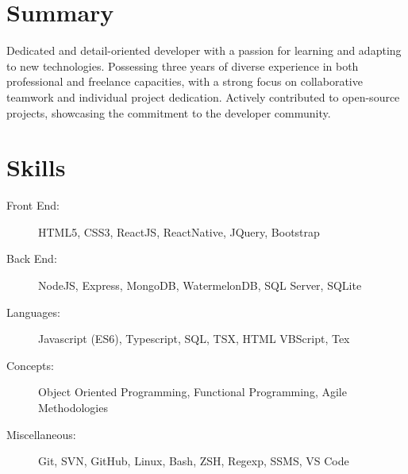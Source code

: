 \documentclass[a4paper,10pt]{article}
\begin{document}

\fancyhead[C]{
}


\section{Summary}
\sloppy
Dedicated and detail-oriented developer with a passion for learning and
adapting to new technologies. Possessing three years of diverse experience in both professional and freelance capacities,
with a strong focus on collaborative teamwork and individual project dedication.
Actively contributed to open-source projects, showcasing the commitment to the developer community.

\section{Skills}

\begin{description}
    \item[Front End:] HTML5, CSS3, ReactJS, ReactNative, JQuery, Bootstrap
    \item[Back End:] NodeJS, Express, MongoDB, WatermelonDB, SQL Server, SQLite
    \item[Languages:] Javascript (ES6), Typescript, SQL, TSX, HTML VBScript, Tex
    \item[Concepts:] Object Oriented Programming, Functional Programming, Agile Methodologies
    \item[Miscellaneous:] Git, SVN, GitHub, Linux, Bash, ZSH, Regexp, SSMS, VS Code
\end{description}
\end{document}
